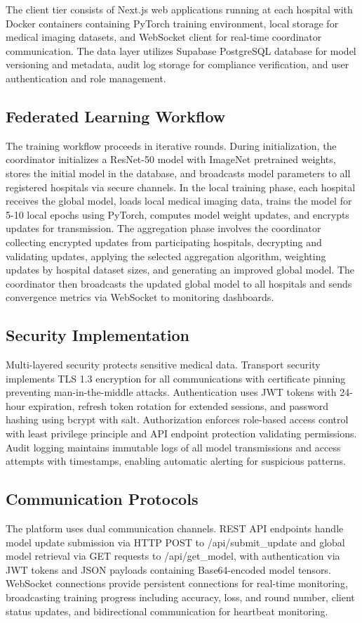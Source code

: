 \documentclass[conference]{IEEEtran}
\begin{document}
The client tier consists of Next.js web applications running at each hospital with Docker containers containing PyTorch training environment, local storage for medical imaging datasets, and WebSocket client for real-time coordinator communication. The data layer utilizes Supabase PostgreSQL database for model versioning and metadata, audit log storage for compliance verification, and user authentication and role management.

\subsection{Federated Learning Workflow}
The training workflow proceeds in iterative rounds. During initialization, the coordinator initializes a ResNet-50 model with ImageNet pretrained weights, stores the initial model in the database, and broadcasts model parameters to all registered hospitals via secure channels. In the local training phase, each hospital receives the global model, loads local medical imaging data, trains the model for 5-10 local epochs using PyTorch, computes model weight updates, and encrypts updates for transmission. The aggregation phase involves the coordinator collecting encrypted updates from participating hospitals, decrypting and validating updates, applying the selected aggregation algorithm, weighting updates by hospital dataset sizes, and generating an improved global model. The coordinator then broadcasts the updated global model to all hospitals and sends convergence metrics via WebSocket to monitoring dashboards.

\subsection{Security Implementation}
Multi-layered security protects sensitive medical data. Transport security implements TLS 1.3 encryption for all communications with certificate pinning preventing man-in-the-middle attacks. Authentication uses JWT tokens with 24-hour expiration, refresh token rotation for extended sessions, and password hashing using bcrypt with salt. Authorization enforces role-based access control with least privilege principle and API endpoint protection validating permissions. Audit logging maintains immutable logs of all model transmissions and access attempts with timestamps, enabling automatic alerting for suspicious patterns.

\subsection{Communication Protocols}
The platform uses dual communication channels. REST API endpoints handle model update submission via HTTP POST to /api/submit\_update and global model retrieval via GET requests to /api/get\_model, with authentication via JWT tokens and JSON payloads containing Base64-encoded model tensors. WebSocket connections provide persistent connections for real-time monitoring, broadcasting training progress including accuracy, loss, and round number, client status updates, and bidirectional communication for heartbeat monitoring.
\end{document}
